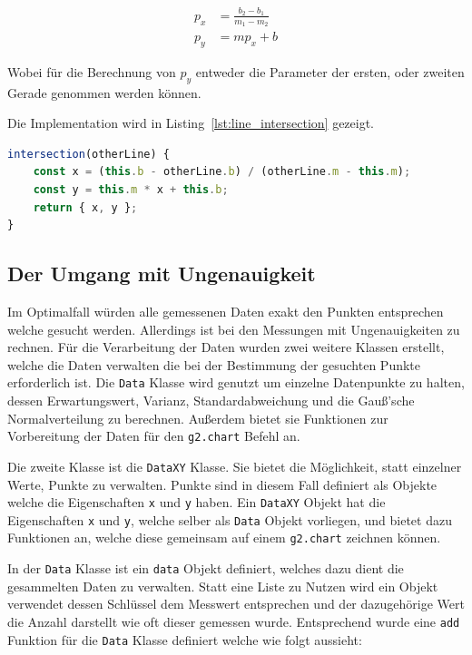 \begin{equation}
    \begin{split}
        p_x &= \frac{b_2 - b_1}{m_1 - m_2} \\
        p_y &= m p_x + b
    \end{split}
    \label{eq:schnittpunkt}
\end{equation}

Wobei für die Berechnung von $p_y$ entweder die Parameter der ersten, oder zweiten Gerade genommen werden können.

Die Implementation wird in Listing~\ref{lst:line_intersection} gezeigt.

\begin{lstlisting}[language=JavaScript, caption={Definition der \lstinline{intersection} Funktion, welche eine Funktion der \lstinline{Line} Klasse darstellt.}, label={lst:line_intersection}]
intersection(otherLine) {
    const x = (this.b - otherLine.b) / (otherLine.m - this.m);
    const y = this.m * x + this.b;
    return { x, y };
}
\end{lstlisting}

\subsection{Der Umgang mit Ungenauigkeit}

Im Optimalfall würden alle gemessenen Daten exakt den Punkten entsprechen welche gesucht werden.
Allerdings ist bei den Messungen mit Ungenauigkeiten zu rechnen.
Für die Verarbeitung der Daten wurden zwei weitere Klassen erstellt, welche die Daten verwalten die bei der Bestimmung der gesuchten Punkte erforderlich ist.
Die \lstinline{Data} Klasse wird genutzt um einzelne Datenpunkte zu halten, dessen Erwartungswert, Varianz, Standardabweichung und die Gau{\ss}'sche Normalverteilung zu berechnen.
Au{\ss}erdem bietet sie Funktionen zur Vorbereitung der Daten für den \lstinline{g2.chart} Befehl an.

Die zweite Klasse ist die \lstinline{DataXY} Klasse.
Sie bietet die Möglichkeit, statt einzelner Werte, Punkte zu verwalten.
Punkte sind in diesem Fall definiert als Objekte welche die Eigenschaften \lstinline{x} und \lstinline{y} haben.
Ein \lstinline{DataXY} Objekt hat die Eigenschaften \lstinline{x} und \lstinline{y}, welche selber als \lstinline{Data} Objekt vorliegen, und bietet dazu Funktionen an, welche diese gemeinsam auf einem \lstinline{g2.chart} zeichnen können.

In der \lstinline{Data} Klasse ist ein \lstinline{data} Objekt definiert, welches dazu dient die gesammelten Daten zu verwalten.
Statt eine Liste zu Nutzen wird ein Objekt verwendet dessen Schlüssel dem Messwert entsprechen und der dazugehörige Wert die Anzahl darstellt wie oft dieser gemessen wurde.
Entsprechend wurde eine \lstinline{add} Funktion für die \lstinline{Data} Klasse definiert welche wie folgt aussieht:

